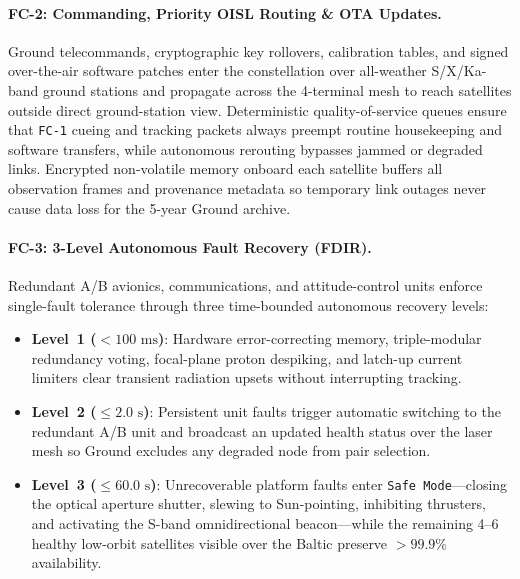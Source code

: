 \paragraph{FC-2: Commanding, Priority OISL Routing \& OTA Updates.}
Ground telecommands, cryptographic key rollovers, calibration tables, and signed over-the-air software patches enter the constellation over all-weather S/X/Ka-band ground stations and propagate across the 4-terminal  mesh to reach satellites outside direct ground-station view. Deterministic quality-of-service queues ensure that \texttt{FC-1} cueing and tracking packets always preempt routine housekeeping and software transfers, while autonomous rerouting bypasses jammed or degraded links. Encrypted non-volatile memory onboard each satellite buffers all observation frames and provenance metadata so temporary link outages never cause data loss for the 5-year Ground archive.

\paragraph{FC-3: 3-Level Autonomous Fault Recovery (FDIR).}
Redundant A/B avionics, communications, and attitude-control units enforce single-fault tolerance through three time-bounded autonomous recovery levels:
\begin{itemize}[leftmargin=1.5em, itemsep=0.12em, topsep=0.12em]
    \item \textbf{Level~1 ($< 100\text{ ms}$)}: Hardware error-correcting memory, triple-modular redundancy voting, focal-plane proton despiking, and latch-up current limiters clear transient radiation upsets without interrupting tracking.
    \item \textbf{Level~2 ($\le 2.0\text{ s}$)}: Persistent unit faults trigger automatic switching to the redundant A/B unit and broadcast an updated health status over the laser mesh so Ground excludes any degraded node from pair selection.
    \item \textbf{Level~3 ($\le 60.0\text{ s}$)}: Unrecoverable platform faults enter \texttt{Safe Mode}---closing the optical aperture shutter, slewing to Sun-pointing, inhibiting thrusters, and activating the S-band omnidirectional beacon---while the remaining 4--6 healthy low-orbit satellites visible over the Baltic preserve $>99.9\%$ availability.
\end{itemize}


